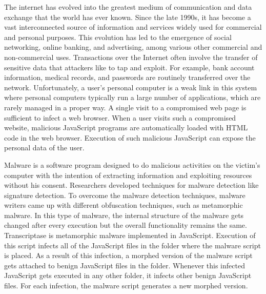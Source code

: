 %
%
The internet has evolved into the greatest medium of communication and data exchange that the world has ever known. Since the late 1990s, it has become a vast interconnected source of information and services widely used for commercial and personal purposes. This evolution has led to the emergence of social networking, online banking, and advertising, among various other commercial and non-commercial uses. Transactions over the Internet often involve the transfer of sensitive data that attackers like to tap and exploit. For example, bank account information, medical records, and passwords are routinely transferred over the network. Unfortunately, a user's personal computer is a weak link in this system where personal computers typically run a large number of applications, which are rarely managed in a proper way. A single visit to a compromised web page is sufficient to infect a web browser. When a user visits such a compromised website, malicious JavaScript programs are automatically loaded with HTML code in the web browser. Execution of such malicious JavaScript can expose the personal data of the user. 

Malware is a software program designed to do malicious activities on the victim's computer with the intention of extracting information and exploiting resources without his consent. Researchers developed techniques for malware detection like signature detection. To overcome the malware detection techniques, malware writers came up with different obfuscation techniques, such as metamorphic malware. In this type of malware, the internal structure of the malware gets changed after every execution but the overall functionality remains the same. Transcriptase is metamorphic malware implemented in JavaScript. Execution of this script infects all of the JavaScript files in the folder where the malware script is placed. As a result of this infection, a morphed version of the malware script gets attached to benign JavaScript files in the folder. Whenever this infected JavaScript gets executed in any other folder, it infects other benign JavaScript files. For each infection, the malware script generates a new morphed version.